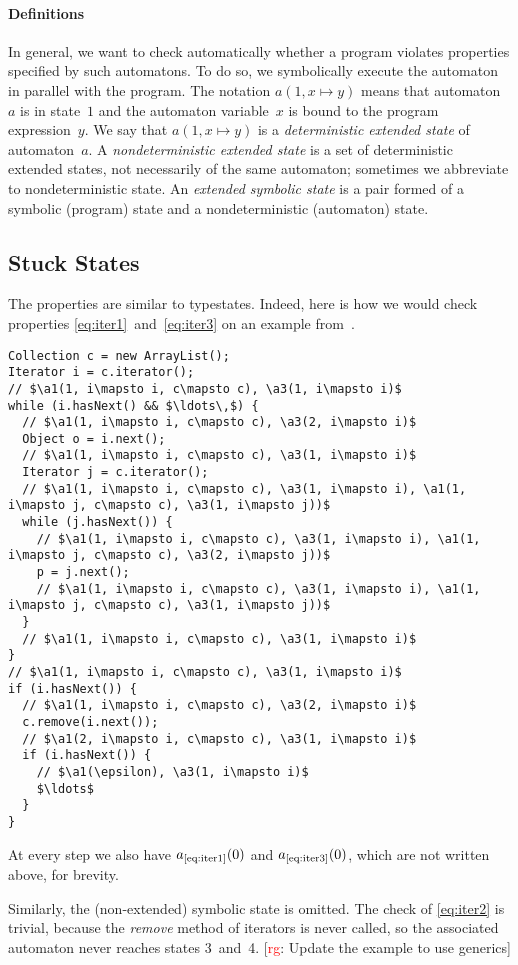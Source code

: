 \documentclass[a4paper]{article}
\newcommand{\todo}[2]{{\small [\textcolor{red}{#1}: #2]}}
\newcommand{\rg}[1]{\todo{rg}{#1}}
\theoremstyle{slanted}
\theoremstyle{definition}
\theoremstyle{remark}
\begin{document}
\paragraph{Definitions}
In general, we want to check automatically whether a program violates properties specified by such automatons.
To do so, we symbolically execute the automaton in parallel with the program.
The notation $a(1, x\mapsto y)$ means that automaton~$a$ is in state~$1$ and the automaton variable~$x$ is bound to the program expression~$y$.
We say that $a(1,x\mapsto y)$ is a \emph{deterministic extended state} of automaton~$a$.
A \emph{nondeterministic extended state} is a set of deterministic extended states, not necessarily of the same automaton;
sometimes we abbreviate to nondeterministic state.
An \emph{extended symbolic state} is a pair formed of a symbolic (program) state and a nondeterministic (automaton) state.

\subsection{Stuck States}\label{sec:stuck} %

The properties are similar to typestates.
Indeed, here is how we would check properties \eqref{eq:iter1}~and~\eqref{eq:iter3} on an example from~\cite{bierhoff2007}.
{\def\a#1{a_\text{\ref{eq:iter#1}} }
\begin{lstlisting}
Collection c = new ArrayList();
Iterator i = c.iterator();
// $\a1(1, i\mapsto i, c\mapsto c), \a3(1, i\mapsto i)$
while (i.hasNext() && $\ldots\,$) {
  // $\a1(1, i\mapsto i, c\mapsto c), \a3(2, i\mapsto i)$
  Object o = i.next();
  // $\a1(1, i\mapsto i, c\mapsto c), \a3(1, i\mapsto i)$
  Iterator j = c.iterator();
  // $\a1(1, i\mapsto i, c\mapsto c), \a3(1, i\mapsto i), \a1(1, i\mapsto j, c\mapsto c), \a3(1, i\mapsto j))$
  while (j.hasNext()) {
    // $\a1(1, i\mapsto i, c\mapsto c), \a3(1, i\mapsto i), \a1(1, i\mapsto j, c\mapsto c), \a3(2, i\mapsto j))$
    p = j.next();
    // $\a1(1, i\mapsto i, c\mapsto c), \a3(1, i\mapsto i), \a1(1, i\mapsto j, c\mapsto c), \a3(1, i\mapsto j))$
  }
  // $\a1(1, i\mapsto i, c\mapsto c), \a3(1, i\mapsto i)$
}
// $\a1(1, i\mapsto i, c\mapsto c), \a3(1, i\mapsto i)$
if (i.hasNext()) {
  // $\a1(1, i\mapsto i, c\mapsto c), \a3(2, i\mapsto i)$
  c.remove(i.next());
  // $\a1(2, i\mapsto i, c\mapsto c), \a3(1, i\mapsto i)$
  if (i.hasNext()) {
    // $\a1(\epsilon), \a3(1, i\mapsto i)$
    $\ldots$
  }
}
\end{lstlisting}
At every step we also have $\a1(0)$ and $\a3(0)$, which are not written above, for brevity.}
Similarly, the (non-extended) symbolic state is omitted.
The check of \eqref{eq:iter2} is trivial, because the \textit{remove} method of iterators is never called, so the associated automaton never reaches states 3~and~4.
\rg{Update the example to use generics}
\end{document}
